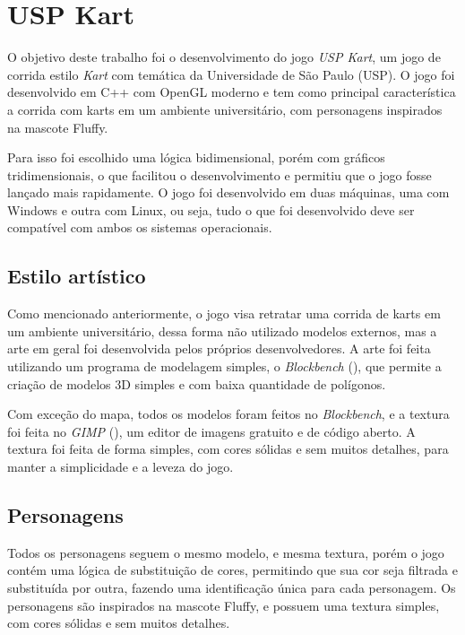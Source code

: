 \chapter{USP Kart}

O objetivo deste trabalho foi o desenvolvimento do jogo \textit{USP Kart}, um jogo de corrida estilo \textit{Kart} com temática da Universidade de São Paulo (USP). O jogo foi desenvolvido em C++ com OpenGL moderno e tem como principal característica a corrida com karts em um ambiente universitário, com personagens inspirados na mascote Fluffy.

Para isso foi escolhido uma lógica bidimensional, porém com gráficos tridimensionais, o que facilitou o desenvolvimento e permitiu que o jogo fosse lançado mais rapidamente. O jogo foi desenvolvido em duas máquinas, uma com Windows e outra com Linux, ou seja, tudo o que foi desenvolvido deve ser compatível com ambos os sistemas operacionais.

\section{Estilo artístico}

Como mencionado anteriormente, o jogo visa retratar uma corrida de karts em um ambiente universitário, dessa forma não utilizado modelos externos, mas a arte em geral foi desenvolvida pelos próprios desenvolvedores. A arte foi feita utilizando um programa de modelagem simples, o \textit{Blockbench} (\cite{prog:blockbench}), que permite a criação de modelos 3D simples e com baixa quantidade de polígonos.

Com exceção do mapa, todos os modelos foram feitos no \textit{Blockbench}, e a textura foi feita no \textit{GIMP} (\cite{prog:gimp}), um editor de imagens gratuito e de código aberto. A textura foi feita de forma simples, com cores sólidas e sem muitos detalhes, para manter a simplicidade e a leveza do jogo.

\pagebreak

\section{Personagens}

Todos os personagens seguem o mesmo modelo, e mesma textura, porém o jogo contém uma lógica de substituição de cores, permitindo que sua cor seja filtrada e substituída por outra, fazendo uma identificação única para cada personagem. Os personagens são inspirados na mascote Fluffy, e possuem uma textura simples, com cores sólidas e sem muitos detalhes.

